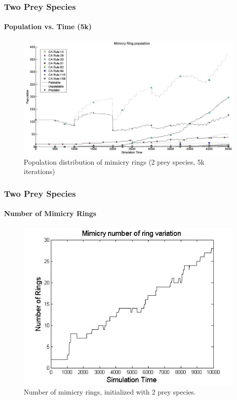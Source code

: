 \frame
{
	\frametitle{Two Prey Species}
	\framesubtitle{Population vs. Time (5k)}
	
	\begin{figure}
		\centering
		\includegraphics[scale=0.25]{../tex/images/simTime5k-2Prey}
		\caption{Population distribution of mimicry rings (2 prey species, 5k iterations)}
		\label{fig:plot-2-prey-5k}
	\end{figure}
}

\frame
{
	\frametitle{Two Prey Species}
	\framesubtitle{Number of Mimicry Rings}

	\begin{figure}[H]
		\centering
		\includegraphics[scale=0.30]{../tex/images/ringSize10k-2Prey}
		\caption{Number of mimicry rings, initialized with 2 prey species.}
		\label{fig:ringSize10k-2Prey}
	\end{figure}	
}

